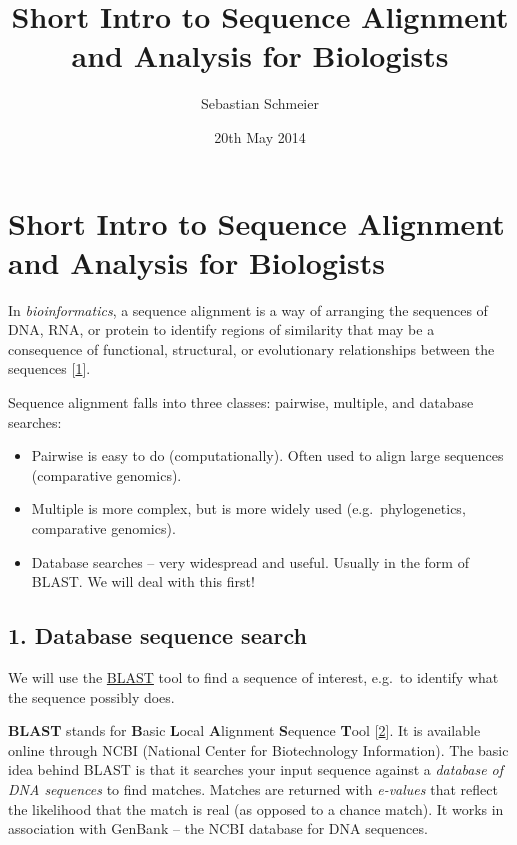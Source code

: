 \documentclass[]{article}
\begin{document}
\title{Short Intro to Sequence Alignment and Analysis for Biologists}
\author{Sebastian Schmeier}
\date{20th May 2014}
\maketitle

\section{Short Intro to Sequence Alignment and Analysis for
Biologists}\label{short-intro-to-sequence-alignment-and-analysis-for-biologists}

In \emph{bioinformatics}, a sequence alignment is a way of arranging the
sequences of DNA, RNA, or protein to identify regions of similarity that
may be a consequence of functional, structural, or evolutionary
relationships between the sequences
{[}\href{http://www.cshlpress.com/default.tpl?cart=14004538673655488\&fromlink=T\&linkaction=full\&linksortby=oop_title\&--eqSKUdatarq=466}{1}{]}.

Sequence alignment falls into three classes: pairwise, multiple, and
database searches:

\begin{itemize}
\itemsep1pt\parskip0pt
\item
  Pairwise is easy to do (computationally). Often used to align large
  sequences (comparative genomics).
\item
  Multiple is more complex, but is more widely used (e.g.~phylogenetics,
  comparative genomics).
\item
  Database searches -- very widespread and useful. Usually in the form
  of BLAST. We will deal with this first!
\end{itemize}

\subsection{1. Database sequence search}\label{database-sequence-search}

We will use the \href{http://blast.ncbi.nlm.nih.gov/}{BLAST} tool to
find a sequence of interest, e.g.~to identify what the sequence possibly
does.

\textbf{BLAST} stands for \textbf{B}asic \textbf{L}ocal
\textbf{A}lignment \textbf{S}equence \textbf{T}ool
{[}\href{http://www.ncbi.nlm.nih.gov/pubmed/?term=9254694}{2}{]}. It is
available online through NCBI (National Center for Biotechnology
Information). The basic idea behind BLAST is that it searches your input
sequence against a \emph{database of DNA sequences} to find matches.
Matches are returned with \emph{e-values} that reflect the likelihood
that the match is real (as opposed to a chance match). It works in
association with GenBank -- the NCBI database for DNA sequences.
\end{document}
